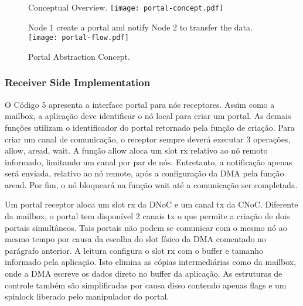 			\begin{figure}[!tb]
				\centering%
				\caption{Portal Abstraction Concept.}%
				\label{fig:portal}%

					{Conceptual Overview.}%
					{\texttt{[image: portal-concept.pdf]}}%

				\hfill

					{Node 1 create a portal and notify Node 2 to transfer the data.}%
					{\texttt{[image: portal-flow.pdf]}}%

			\end{figure}

			\subsubsection{Receiver Side Implementation}

				O Código 5 apresenta a interface portal para nós receptores.
				Assim como a mailbox, a aplicação deve identificar o nó local para criar um portal.
				As demais funções utilizam o identificador do portal retornado pela função de criação.
				Para criar um canal de comunicação, o receptor sempre deverá executar 3 operações, allow, aread, wait.
				A função allow aloca um slot rx relativo ao nó remoto informado, limitando um canal por par de nós.
				Entretanto, a notificação apenas será enviada, relativo ao nó remote, após a configuração da DMA pela função aread.
				Por fim, o nó bloqueará na função wait até a comunicação ser completada.

				Um portal receptor aloca um slot rx da DNoC e um canal tx da CNoC.
				Diferente da mailbox, o portal tem disponível 2 canais tx o que permite a criação de dois portais simultâneos.
				Tais portais não podem se comunicar com o mesmo nó ao mesmo tempo por causa da escolha do slot físico da DMA comentado no parágrafo anterior.
				A leitura configura o slot rx com o buffer e tamanho informado pela aplicação.
				Isto elimina as cópias intermediárias como da mailbox, onde a DMA escreve os dados direto no buffer da aplicação.
				As estruturas de controle também são simplificadas por causa disso
				contendo apenas flags e um spinlock liberado pelo manipulador do portal.

